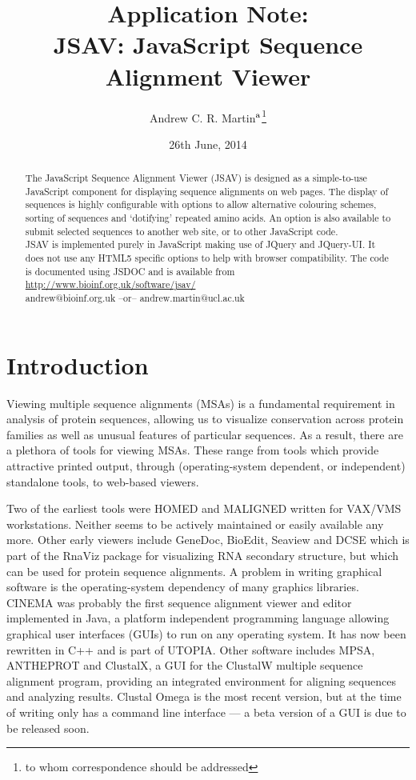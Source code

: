 \documentclass[a4]{bioinfo}
\title[JSAV: JavaScript Sequence Alignment Viewer]{Application Note:\\
JSAV: JavaScript Sequence Alignment Viewer}
\date{26th June, 2014}
\author[Martin]{Andrew C. R. Martin\mbox{${}^{\rm a}$}\footnote{to whom
    correspondence should be addressed}}
\begin{document}
\maketitle

\begin{abstract}
 The JavaScript Sequence Alignment Viewer
(JSAV) is designed as a simple-to-use JavaScript component for
displaying sequence alignments on web pages.  The display of sequences
is highly configurable with options to allow alternative colouring
schemes, sorting of sequences and `dotifying' repeated amino acids. An
option is also available to submit selected sequences to another web
site, or to other JavaScript code.  \\
JSAV is implemented purely in JavaScript making use of JQuery and
JQuery-UI. It does not use any HTML5 specific options to help with
browser compatibility. The code is documented using JSDOC
and is available from \url{http://www.bioinf.org.uk/software/jsav/}\\
 andrew@bioinf.org.uk --or--
andrew.martin@ucl.ac.uk
\end{abstract}


\section{Introduction}
Viewing multiple sequence alignments (MSAs) is a fundamental
requirement in analysis of protein sequences, allowing us to visualize
conservation across protein families as well as unusual features of
particular sequences. As a result, there are a plethora of tools for
viewing MSAs. These range from tools which provide attractive printed
output, through (operating-system dependent, or independent)
standalone tools, to web-based viewers.

Two of the earliest tools were HOMED\cite{stockwell:homed} and
MALIGNED\cite{clark:maligned} written for VAX/VMS workstations.
Neither seems to be actively maintained or easily available any
more. Other early viewers include GeneDoc\cite{nicholas:genedoc},
BioEdit, Seaview\cite{galtier:seaview} and DCSE\cite{derijk:dcse}
which is part of the RnaViz package for visualizing RNA secondary
structure\cite{derijk:rnaviz}, but which can be used for protein
sequence alignments.  A problem in writing graphical software is the
operating-system dependency of many graphics
libraries. CINEMA\cite{parrysmith:cinema} was probably the first
sequence alignment viewer and editor implemented in Java, a platform
independent programming language allowing graphical user interfaces
(GUIs) to run on any operating system. It has now been rewritten in
C++ and is part of UTOPIA\cite{pettifer:utopia}. Other software
includes MPSA\cite{blanchet:mpsa}, ANTHEPROT\cite{deleage:antheprot}
and ClustalX\cite{thompson:clustalx}, a GUI for the ClustalW multiple
sequence alignment program, providing an integrated environment for
aligning sequences and analyzing results. Clustal Omega is the most
recent version, but at the time of writing only has a command line
interface --- a beta version of a GUI is due to be released soon.
\end{document}
